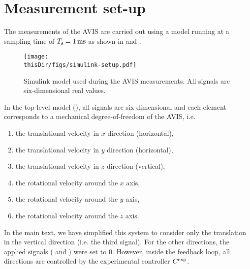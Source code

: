 
\section{ Measurement set-up}
The measurements of the \gls{AVIS} are carried out using a \Simulink model running at a sampling time of $T_{\mathrm{s}} = 1\,\mathrm{ms}$ as shown in  and .

\begin{figure}
\setlength\figurewidth{\columnwidth}
  \texttt{[image: \\thisDir/figs/simulink-setup.pdf]}
  \caption{Simulink model used during the AVIS measurements. All signals are six-dimensional real values.}
  \label{fig:avis:simulink:setup}
\end{figure}

In the top-level model (), all signals are six-dimensional and each element corresponds to a mechanical degree-of-freedom of the \gls{AVIS}, i.e.
\begin{enumerate}
  \item the translational velocity in $x$ direction (horizontal),
  \item the translational velocity in $y$ direction (horizontal),
  \item the translational velocity in $z$ direction (vertical),
  \item the rotational velocity around the $x$ axis,
  \item the rotational velocity around the $y$ axis,
  \item the rotational velocity around the $z$ axis.
\end{enumerate}
In the main text, we have simplified this system to consider only the translation in the vertical direction (i.e. the third signal).
For the other directions, the applied signals ( and ) were set to $0$.
However, inside the feedback loop, all directions are controlled by the experimental controller $C^{\mathrm{exp}}$.

